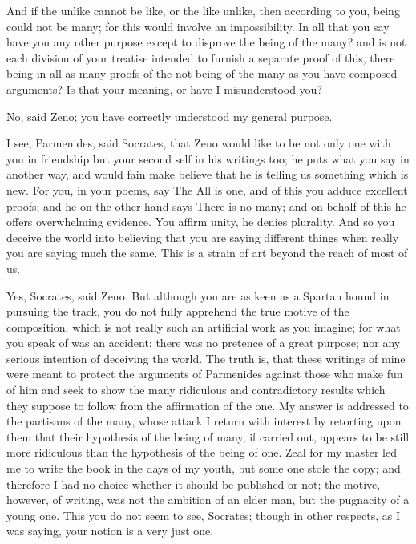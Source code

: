 \documentclass[11pt,letter]{article}
\begin{document}
\par  And if the unlike cannot be like, or the like unlike, then according to you, being could not be many; for this would involve an impossibility. In all that you say have you any other purpose except to disprove the being of the many? and is not each division of your treatise intended to furnish a separate proof of this, there being in all as many proofs of the not-being of the many as you have composed arguments? Is that your meaning, or have I misunderstood you?

\par  No, said Zeno; you have correctly understood my general purpose.

\par  I see, Parmenides, said Socrates, that Zeno would like to be not only one with you in friendship but your second self in his writings too; he puts what you say in another way, and would fain make believe that he is telling us something which is new. For you, in your poems, say The All is one, and of this you adduce excellent proofs; and he on the other hand says There is no many; and on behalf of this he offers overwhelming evidence. You affirm unity, he denies plurality. And so you deceive the world into believing that you are saying different things when really you are saying much the same. This is a strain of art beyond the reach of most of us.

\par  Yes, Socrates, said Zeno. But although you are as keen as a Spartan hound in pursuing the track, you do not fully apprehend the true motive of the composition, which is not really such an artificial work as you imagine; for what you speak of was an accident; there was no pretence of a great purpose; nor any serious intention of deceiving the world. The truth is, that these writings of mine were meant to protect the arguments of Parmenides against those who make fun of him and seek to show the many ridiculous and contradictory results which they suppose to follow from the affirmation of the one. My answer is addressed to the partisans of the many, whose attack I return with interest by retorting upon them that their hypothesis of the being of many, if carried out, appears to be still more ridiculous than the hypothesis of the being of one. Zeal for my master led me to write the book in the days of my youth, but some one stole the copy; and therefore I had no choice whether it should be published or not; the motive, however, of writing, was not the ambition of an elder man, but the pugnacity of a young one. This you do not seem to see, Socrates; though in other respects, as I was saying, your notion is a very just one.
\end{document}
